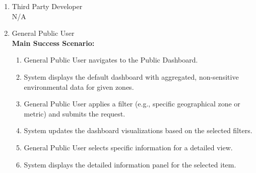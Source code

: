 {\begin{enumerate}[{\bf BE1.}]
\begin{enumerate}[{\bf VP1.}]
            {\bf Secondary Scenario:}
            \begin{itemize}
                \item[] {3i.} System finds no data matching the selected filters.
                \begin{itemize}
                    \item[] {3i.1.} System queries the database but finds no matching records.
                    \item[] {3i.2.} System displays a "No Data Found" message in the visualization widgets and prompts the Operator to adjust the filters.
                \end{itemize}
            \end{itemize}
        \item {Third Party Developer} \\ N/A
        \item General Public User \\ 
            {\bf Main Success Scenario:}
                \begin{enumerate}[1. ]
                    \item General Public User navigates to the Public Dashboard.
                    \item System displays the default dashboard with aggregated, non-sensitive environmental data for given zones.
                    \item General Public User applies a filter (e.g., specific geographical zone or metric) and submits the request.
                    \item System updates the dashboard visualizations based on the selected filters.
                    \item General Public User selects specific information for a detailed view.
                    \item System displays the detailed information panel for the selected item.
                \end{enumerate}


\end{enumerate}
\end{enumerate}}
